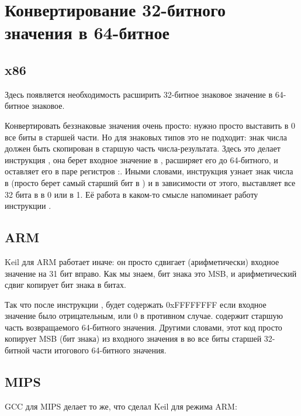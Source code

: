 ﻿\section{Конвертирование 32-битного значения в 64-битное}
\label{subsec:sign_extending_32_to_64}



\subsection{x86}



Здесь появляется необходимость расширить 32-битное знаковое значение в 64-битное знаковое.

Конвертировать беззнаковые значения очень просто: нужно просто выставить в 0 все биты в старшей части.
Но для знаковых типов это не подходит: знак числа должен быть скопирован в старшую часть числа-результата.
Здесь это делает инструкция , она берет входное значение в \EAX{}, расширяет его до 64-битного,
и оставляет его в паре регистров \EDX{}:\EAX{}.
Иными словами, инструкция  узнает знак числа в \EAX{} (просто берет самый старший бит в \EAX{}) и в зависимости от этого,
выставляет все 32 бита в \EDX{} в 0 или в 1.
Её работа в каком-то смысле напоминает работу инструкции \MOVSX{}.

\subsection{ARM}



Keil для ARM работает иначе: он просто сдвигает (арифметически) входное значение на 31 бит вправо.
Как мы знаем, бит знака это \ac{MSB}, и арифметический сдвиг копирует бит знака в  битах.

Так что после инструкции ,  будет содержать 0xFFFFFFFF если входное значение
было отрицательным, или 0 в противном случае.
 содержит старшую часть возвращаемого 64-битного значения.
Другими словами, этот код просто копирует \ac{MSB} (бит знака) из входного значения в  во все
биты старшей 32-битной части итогового 64-битного значения.

\subsection{MIPS}

GCC для MIPS делает то же, что сделал Keil для режима ARM:



